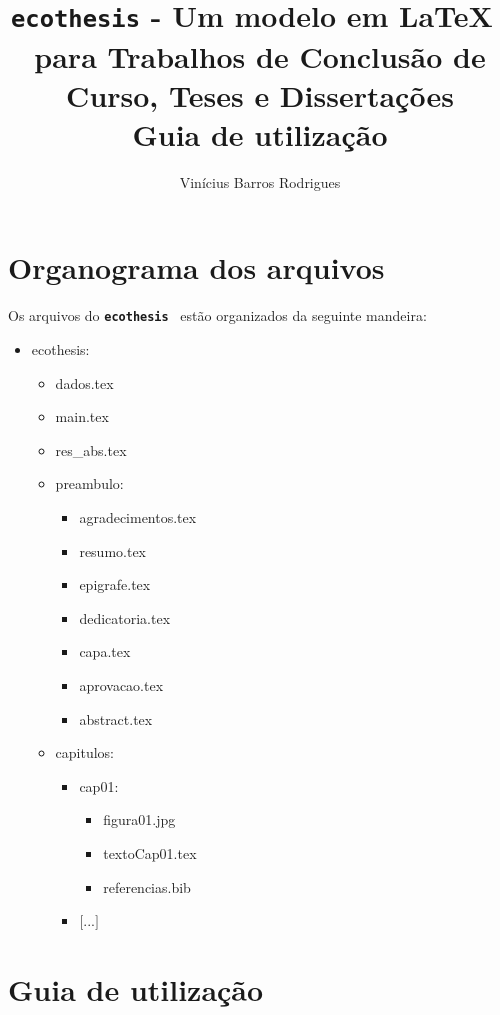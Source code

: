 \documentclass{article}
\title{\texttt{ecothesis} - Um modelo em \LaTeX~ para Trabalhos de Conclusão de Curso, Teses e Dissertações\\\textbf{Guia de utilização}}
\author{Vinícius Barros Rodrigues}
\newcommand{\modelo}{\texttt{\textbf{ecothesis}}}
\begin{document}
\maketitle

\section{Organograma dos arquivos}

Os arquivos do \modelo~ estão organizados da seguinte mandeira:


\begin{itemize}
\ttfamily
 \item ecothesis:
 \begin{itemize}
  \item dados.tex
  \item main.tex
  \item res\_abs.tex
  \item preambulo:
  \begin{itemize}
   \item agradecimentos.tex
   \item resumo.tex
   \item epigrafe.tex
   \item dedicatoria.tex
   \item capa.tex
   \item aprovacao.tex
   \item abstract.tex
  \end{itemize}
    \item capitulos:
    \begin{itemize}
     \item cap01:
     \begin{itemize}
      \item figura01.jpg
      \item textoCap01.tex
      \item referencias.bib
     \end{itemize}

     \item $[$...$]$
    \end{itemize}

 \end{itemize}


\end{itemize}

\section{Guia de utilização}
\end{document}
